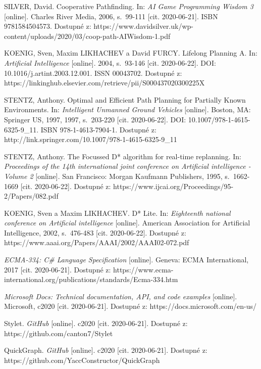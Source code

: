 \begin{thebibliography}{99}
SILVER, David. Cooperative Pathfinding. In: \textit{AI Game Programming Wisdom 3} [online]. Charles River Media, 2006, s.~99-111 [cit. 2020-06-21]. ISBN 9781584504573. Dostupné z: https://www.davidsilver.uk/wp-content/uploads/2020/03/coop-path-AIWisdom-1.pdf

KOENIG, Sven, Maxim LIKHACHEV a David FURCY. Lifelong Planning A. In: \textit{Artificial Intelligence} [online]. 2004, s.~93-146 [cit. 2020-06-22]. DOI: 10.1016/j.artint.2003.12.001. ISSN 00043702. Dostupné z: https://linkinghub.elsevier.com/retrieve/pii/S000437020300225X

STENTZ, Anthony. Optimal and Efficient Path Planning for Partially Known Environments. In: \textit{Intelligent Unmanned Ground Vehicles} [online]. Boston, MA: Springer US, 1997, 1997, s.~203-220 [cit. 2020-06-22]. DOI: 10.1007/978-1-4615-6325-9\_11. ISBN 978-1-4613-7904-1. Dostupné z: http://link.springer.com/10.1007/978-1-4615-6325-9\_11

STENTZ, Anthony. The Focussed D* algorithm for real-time replanning. In: \textit{Proceedings of the 14th international joint conference on Artificial intelligence - Volume 2} [online]. San Francisco: Morgan Kaufmann Publishers, 1995, s.~1662-1669 [cit. 2020-06-22]. Dostupné z: https://www.ijcai.org/Proceedings/95-2/Papers/082.pdf

KOENIG, Sven a Maxim LIKHACHEV. D* Lite. In: \textit{Eighteenth national conference on Artificial intelligence} [online]. American Association for Artificial Intelligence, 2002, s.~476-483 [cit. 2020-06-22]. Dostupné z: https://www.aaai.org/Papers/AAAI/2002/AAAI02-072.pdf


\textit{ECMA-334: C\# Language Specification} [online]. Geneva: ECMA International, 2017 [cit. 2020-06-21]. Dostupné z: https://www.ecma-international.org/publications/standards/Ecma-334.htm

\textit{Microsoft Docs: Technical documentation, API, and code examples} [online]. Microsoft, c2020 [cit. 2020-06-21]. Dostupné z: https://docs.microsoft.com/en-us/

Stylet. \textit{GitHub} [online]. c2020 [cit. 2020-06-21]. Dostupné z: https://github.com/canton7/Stylet

QuickGraph. \textit{GitHub} [online]. c2020 [cit. 2020-06-21]. Dostupné z: https://github.com/YaccConstructor/QuickGraph


\end{thebibliography}
